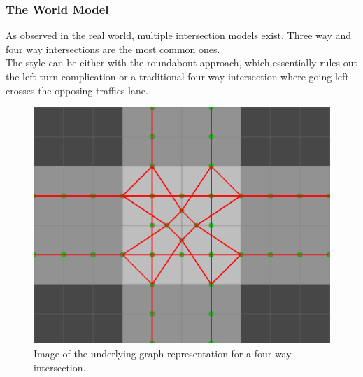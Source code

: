 
\subsubsection{The World Model}
As observed in the real world, multiple intersection models exist. Three way and four way intersections are the most common ones.\\
The style can be either with the roundabout approach, which essentially rules out the left turn complication or a traditional four way intersection where going left crosses the opposing traffics lane.

\begin{figure}
\centering
\includegraphics[scale=.4]{img/graph.png}
\caption{Image of the underlying graph representation for a four way intersection.}
\label{figure:graph}
\end{figure}

